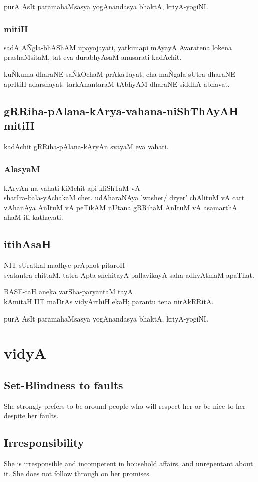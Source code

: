 \documentclass[oneside, article]{memoir}
\begin{document}
purA AsIt paramahaMsasya yogAnandasya bhaktA, kriyA-yogiNI.

\subsection{mitiH}
sadA A\~Ngla-bhAShAM upayojayati, yatkimapi mAyayA Avaratena lokena prashaMsitaM, tat eva durabhyAsaM anusarati kadAchit.

ku\~Nkuma-dharaNE sa\~NkOchaM prAkaTayat, cha ma\~Ngala-sUtra-dharaNE aprItiH adarshayat. tarkAnantaraM tAbhyAM dharaNE siddhA abhavat.


\section{gRRiha-pAlana-kArya-vahana-niShThAyAH mitiH}
kadAchit gRRiha-pAlana-kAryAn svayaM eva vahati.

\subsection{AlasyaM}
kAryAn na vahati kiMchit api kliShTaM vA \\sharIra-bala-yAchakaM chet. udAharaNAya 'washer/ dryer' chAlituM vA cart vAhanAya AnItuM vA peTikAM nUtana gRRihaM AnItuM vA asamarthA ahaM iti kathayati.

\section{itihAsaH}
NIT sUratkal-madhye prApnot pitaroH \\
svatantra-chittaM. tatra Apta-snehitayA pallavikayA saha adhyAtmaM apaThat.

BASE-taH aneka varSha-paryantaM tayA \\
kAmitaH IIT maDrAs vidyArthiH ekaH; parantu tena nirAkRRitA.

purA AsIt paramahaMsasya yogAnandasya bhaktA, kriyA-yogiNI.

\chapter{vidyA}
\section{Set-Blindness to faults}
She strongly prefers to be around people who will respect her or be nice to her despite her faults.

\section{Irresponsibility}
She is irresponsible and incompetent in household affairs, and unrepentant about it. She does not follow through on her promises.
\end{document}
